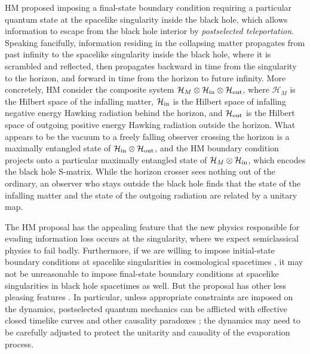 \documentclass[11pt]{article}
\begin{document}
HM proposed imposing a final-state boundary condition requiring a particular quantum state at the spacelike singularity inside the black hole, which allows information to escape from the black hole interior by {\em postselected teleportation}. Speaking fancifully, information residing in the collapsing matter propagates from past infinity to the spacelike singularity inside the black hole, where it is scrambled and reflected, then propagates backward in time from the singularity to the horizon, and forward in time from the horizon to future infinity. More concretely, HM consider the composite system $\mathcal{H}_M\otimes \mathcal{H}_{\rm in}\otimes\mathcal{H}_{\rm out}$, where $\mathcal{H}_M$ is the Hilbert space of the infalling matter, $\mathcal{H}_{\rm in }$ is the Hilbert space of infalling negative energy Hawking radiation behind the horizon, and $\mathcal{H}_{\rm out}$ is the Hilbert space of outgoing positive energy Hawking radiation outside the horizon. What appears to be the vacuum to a freely falling observer crossing the horizon is a maximally entangled state of $\mathcal{H}_{\rm in}\otimes\mathcal{H}_{\rm out}$, and the HM boundary condition projects onto a particular maximally entangled state of $\mathcal{H}_M\otimes\mathcal{H}_{\rm in}$, which encodes the black hole S-matrix. While the horizon crosser sees nothing out of the ordinary, an observer who stays outside the black hole finds that the state of the infalling matter and the state of the outgoing radiation are related by a unitary map.

The HM proposal has the appealing feature that the new physics responsible for evading information loss occurs at the singularity, where we expect semiclassical physics to fail badly. Furthermore, if we are willing to impose initial-state boundary conditions at spacelike singularities in cosmological spacetimes \cite{hartle-hawking}, it may not be unreasonable to impose final-state boundary conditions at spacelike singularities in black hole spacetimes as well. But the proposal has other less pleasing features \cite{gottesman,lloyd}. In particular, unless appropriate constraints are imposed on the dynamics, postselected quantum mechanics can be afflicted with effective closed timelike curves and other causality paradoxes \cite{aharonov,lloyd-ctc1,lloyd-ctc2}; the dynamics may need to be carefully adjusted to protect the unitarity and causality of the evaporation process. 
\end{document}
